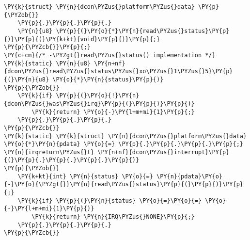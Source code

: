 \begin{Verbatim}[commandchars=\\\{\},codes={\catcode`\$=3\catcode`\^=7\catcode`\_=8}]
\PY{k}{struct} \PY{n}{dcon\PYZus{}platform\PYZus{}data} \PY{p}{\PYZob{}}
    \PY{p}{.}\PY{p}{.}\PY{p}{.}
    \PY{n}{u8} \PY{p}{(}\PY{o}{*}\PY{n}{read\PYZus{}status}\PY{p}{)}\PY{p}{(}\PY{k+kt}{void}\PY{p}{)}\PY{p}{;}
\PY{p}{\PYZcb{}}\PY{p}{;}
\PY{c+cm}{/* -\PYZgt{}read\PYZus{}status() implementation */}
\PY{k}{static} \PY{n}{u8} \PY{n+nf}{dcon\PYZus{}read\PYZus{}status\PYZus{}xo\PYZus{}1\PYZus{}5}\PY{p}{(}\PY{n}{u8} \PY{o}{*}\PY{n}{status}\PY{p}{)}
\PY{p}{\PYZob{}}
    \PY{k}{if} \PY{p}{(}\PY{o}{!}\PY{n}{dcon\PYZus{}was\PYZus{}irq}\PY{p}{(}\PY{p}{)}\PY{p}{)}
        \PY{k}{return} \PY{o}{-}\PY{l+m+mi}{1}\PY{p}{;}
    \PY{p}{.}\PY{p}{.}\PY{p}{.}
\PY{p}{\PYZcb{}}
\PY{k}{static} \PY{k}{struct} \PY{n}{dcon\PYZus{}platform\PYZus{}data} \PY{o}{*}\PY{n}{pdata} \PY{o}{=} \PY{p}{.}\PY{p}{.}\PY{p}{.}\PY{p}{;}
\PY{n}{irqreturn\PYZus{}t} \PY{n+nf}{dcon\PYZus{}interrupt}\PY{p}{(}\PY{p}{.}\PY{p}{.}\PY{p}{.}\PY{p}{)}
\PY{p}{\PYZob{}}
    \PY{k+kt}{int} \PY{n}{status} \PY{o}{=} \PY{n}{pdata}\PY{o}{-}\PY{o}{\PYZgt{}}\PY{n}{read\PYZus{}status}\PY{p}{(}\PY{p}{)}\PY{p}{;}
    \PY{k}{if} \PY{p}{(}\PY{n}{status} \PY{o}{=}\PY{o}{=} \PY{o}{-}\PY{l+m+mi}{1}\PY{p}{)}
        \PY{k}{return} \PY{n}{IRQ\PYZus{}NONE}\PY{p}{;}
    \PY{p}{.}\PY{p}{.}\PY{p}{.}
\PY{p}{\PYZcb{}}
\end{Verbatim}
